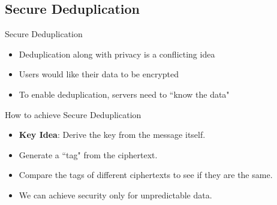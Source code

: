 \documentclass{beamer}
\begin{document}
\subsection{Secure Deduplication}


\begin{frame}{Secure Deduplication}
\begin{itemize}
	\setlength\itemsep{1em}
	\item Deduplication along with privacy is a conflicting idea

	\item Users would like their data to be encrypted
	
	\item To enable deduplication, servers need to ``know the data"
\end{itemize}
\end{frame}

\begin{frame}{How to achieve Secure Deduplication}
	\begin{itemize}
		\setlength\itemsep{1em}
		\item \textbf{Key Idea}: Derive the key from the message itself.
		\item Generate a ``tag" from the ciphertext.
		\item Compare the tags of different ciphertexts to see if they are the same.
		\item We can achieve security only for unpredictable data.
	\end{itemize}
\end{frame}
\end{document}
